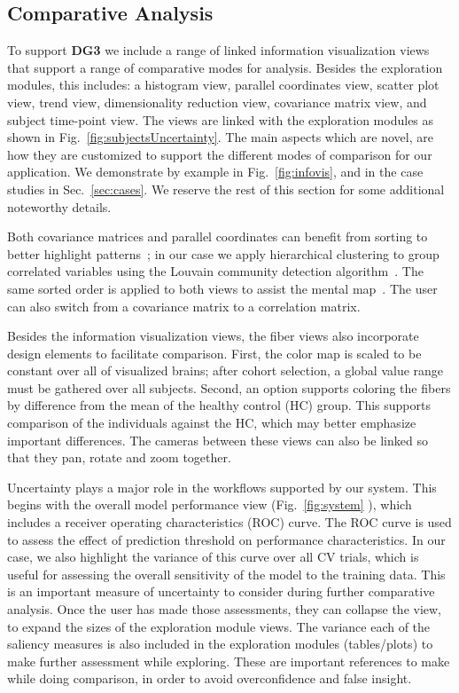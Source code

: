 \subsection{Comparative Analysis}
\label{sec:comparison}

\noindent To support \textbf{DG3} we include a range of linked information visualization views that support a range of comparative modes for analysis. Besides the exploration modules, this includes: a histogram view, parallel coordinates view, scatter plot view, trend view, dimensionality reduction view, covariance matrix view, and subject time-point view. The views are linked with the exploration modules as shown in Fig.~\ref{fig:subjectsUncertainty}. The main aspects which are novel, are how they are customized to support the different modes of comparison for our application. We demonstrate by example in Fig.~\ref{fig:infovis}, and in the case studies in Sec.~\ref{sec:cases}. We reserve the rest of this section for some additional noteworthy details.  

Both covariance matrices and parallel coordinates can benefit from sorting to better highlight patterns~\cite{1382895}; in our case we apply hierarchical clustering to group correlated variables using the Louvain community detection algorithm~\cite{donetti2004detecting}. The same sorted order is applied to both views to assist the mental map~\cite{1215004}. The user can also switch from a covariance matrix to a correlation matrix.

Besides the information visualization views, the fiber views also incorporate design elements to facilitate comparison. First, the color map is scaled to be constant over all of visualized brains; after cohort selection, a global value range must be gathered over all subjects. Second, an option supports coloring the fibers by difference from the mean of the healthy control (HC) group. This supports comparison of the individuals against the HC, which may better emphasize important differences. The cameras between these views can also be linked so that they pan, rotate and zoom together. 

Uncertainty plays a major role in the workflows supported by our system. This begins with the overall model performance view (Fig.~\ref{fig:system} ), which includes a receiver operating characteristics (ROC) curve. The ROC curve is used to assess the effect of prediction threshold on performance characteristics. In our case, we also highlight the variance of this curve over all CV trials, which is useful for assessing the overall sensitivity of the model to the training data. This is an important measure of uncertainty to consider during further comparative analysis. Once the user has made those assessments, they can collapse the view, to expand the sizes of the exploration module views. The variance each of the saliency measures is also included in the exploration modules (tables/plots) to make further assessment while exploring. These are important references to make while doing comparison, in order to avoid overconfidence and false insight.
